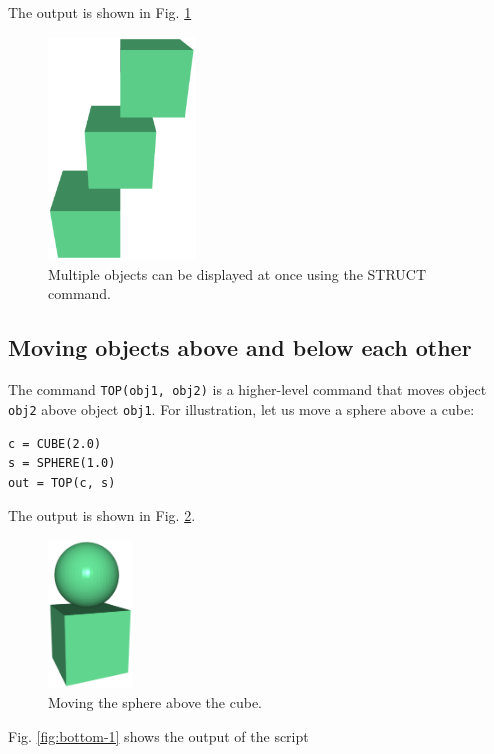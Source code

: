 \noindent
The output is shown in Fig. \ref{fig:comp-1}
\newpage
\begin{figure}[!ht]
\begin{center}
\includegraphics[width=0.35\textwidth]{img/comp-1.png}
\end{center}
\vspace{-4mm}
\caption{Multiple objects can be displayed at once using the STRUCT command.}
\label{fig:comp-1}
\end{figure}


\subsection{Moving objects above and below each other}

The command {\tt TOP(obj1, obj2)} is a higher-level command that 
moves object {\tt obj2} above object {\tt obj1}. 
For illustration, let us move a sphere above a cube:\\

\begin{bbox}
\begin{verbatim}
c = CUBE(2.0)
s = SPHERE(1.0)
out = TOP(c, s)
\end{verbatim}
\end{bbox}
\vspace{6mm}

\noindent
The output is shown in Fig. \ref{fig:top-1}.
\newpage

\begin{figure}[!ht]
\begin{center}
\includegraphics[width=0.2\textwidth]{img/top-1.png}
\end{center}
\vspace{-4mm}
\caption{Moving the sphere above the cube.}
\label{fig:top-1}
\end{figure}
\noindent
Fig. \ref{fig:bottom-1} shows the output of the script\\

